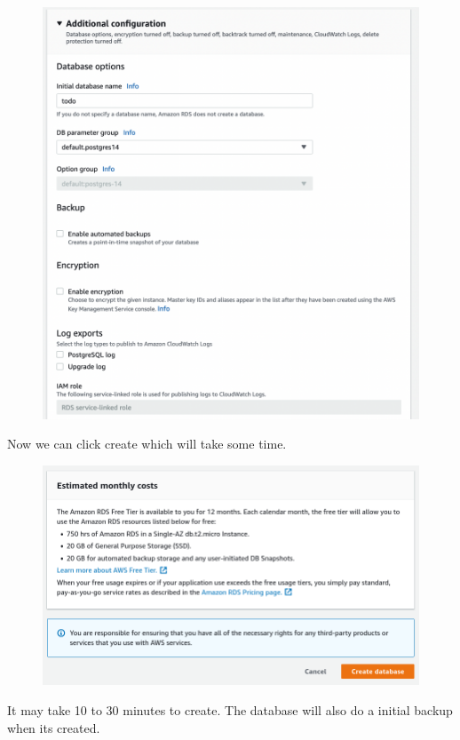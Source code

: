\documentclass{csse4400}
\begin{document}
\begin{figure}[H]
  \includegraphics[width=\textwidth]{images/db7}
\end{figure}

Now we can click create which will take some time.

\begin{figure}[H]
  \includegraphics[width=\textwidth]{images/db8}
\end{figure}

It may take 10 to 30 minutes to create.
The database will also do a initial backup when its created.
\end{document}
